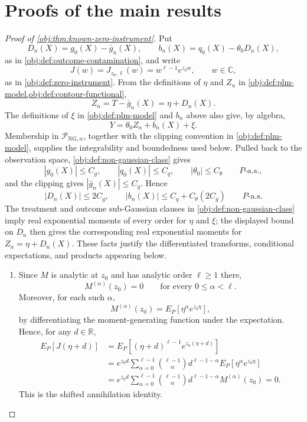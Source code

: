 \documentclass[11pt]{article}
\begin{document}
\section{Proofs of the main results}\label{sec:deferred-proofs}

\begin{proof}[Proof of \cref{obj:thm:known-zero-instrument}]
Put
\[
D_n(X)=g_0(X)-\bar g_n(X),\qquad
b_n(X)=q_0(X)-\theta_0D_n(X),
\]
as in \cref{obj:def:outcome-contamination}, and write
\[
J(w)=J_{z_0,\ell}(w)=w^{\ell-1}e^{z_0w},\qquad w\in\mathbb C,
\]
as in \cref{obj:def:zero-instrument}.  From the definitions of \(\eta\) and \(Z_n\) in \cref{obj:def:plm-model,obj:def:contour-functional},
\[
Z_n=T-\bar g_n(X)=\eta+D_n(X).
\]
The definitions of \(\xi\) in \cref{obj:def:plm-model} and \(b_n\) above also give, by algebra,
\[
Y=\theta_0Z_n+b_n(X)+\xi .
\]
Membership in \(\mathcal P_{\mathrm{NG},n}\), together with the clipping convention in \cref{obj:def:plm-model}, supplies the integrability and boundedness used below.  Pulled back to the observation space, \cref{obj:def:non-gaussian-class} gives
\[
|g_0(X)|\le C_g,\qquad |q_0(X)|\le C_q,\qquad |\theta_0|\le C_{\theta}
\qquad P\text{-a.s.},
\]
and the clipping gives \(|\bar g_n(X)|\le C_g\).  Hence
\[
|D_n(X)|\le 2C_g,
\qquad
|b_n(X)|\le C_q+C_{\theta}(2C_g)
\qquad P\text{-a.s.}
\]
The treatment and outcome sub-Gaussian clauses in \cref{obj:def:non-gaussian-class} imply real exponential moments of every order for \(\eta\) and \(\xi\); the displayed bound on \(D_n\) then gives the corresponding real exponential moments for \(Z_n=\eta+D_n(X)\).  These facts justify the differentiated transforms, conditional expectations, and products appearing below.

\begin{enumerate}
\item Since \(M\) is analytic at \(z_0\) and has analytic order \(\ell\ge1\) there,
\[
M^{(\alpha)}(z_0)=0\qquad\text{for every }0\le\alpha<\ell .
\]
Moreover, for each such \(\alpha\),
\[
M^{(\alpha)}(z_0)
=
E_P\!\left[\eta^\alpha e^{z_0\eta}\right],
\]
by differentiating the moment-generating function under the expectation. Hence, for any \(d\in\mathbb R\),
\[
\begin{aligned}
E_P[J(\eta+d)]
&=
E_P\!\left[(\eta+d)^{\ell-1}e^{z_0(\eta+d)}\right]  \\
&=
e^{z_0d}
\sum_{\alpha=0}^{\ell-1}
\binom{\ell-1}{\alpha}d^{\ell-1-\alpha}
E_P\!\left[\eta^\alpha e^{z_0\eta}\right] \\
&=
e^{z_0d}
\sum_{\alpha=0}^{\ell-1}
\binom{\ell-1}{\alpha}d^{\ell-1-\alpha}
M^{(\alpha)}(z_0)
=0 .
\end{aligned}
\]
This is the shifted annihilation identity. %


\end{enumerate}
\end{proof}
\end{document}
